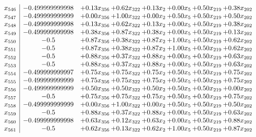 \documentclass[8pt]{article}
\begin{document}
\[\begin{array}{c| c c@{\hskip 2pt} c@{\hskip 2pt} c@{\hskip 2pt} c@{\hskip 2pt} c@{\hskip 2pt} c@{\hskip 2pt} }
 x_{546}   &  -0.499999999998 & +  0.13 x_{356} & +  0.62 x_{322} & +  0.13 x_{2} & +  0.00 x_{5} & +  0.50 x_{219} & +  0.38 x_{202}\\
 x_{547}   &  -0.499999999999 & +  0.00 x_{356} & +  1.00 x_{322} & +  0.00 x_{2} & +  0.50 x_{5} & +  0.50 x_{219} & +  0.50 x_{202}\\
 x_{548}   &  -0.499999999998 & +  0.13 x_{356} & +  0.62 x_{322} & +  0.13 x_{2} & +  0.00 x_{5} & +  0.50 x_{219} & +  0.38 x_{202}\\
 x_{549}   &  -0.499999999998 & +  0.38 x_{356} & +  0.87 x_{322} & +  0.38 x_{2} & +  0.00 x_{5} & +  0.50 x_{219} & +  0.13 x_{202}\\
 x_{550}   &  -0.5 & +  0.87 x_{356} & +  0.38 x_{322} & +  0.87 x_{2} & +  1.00 x_{5} & +  0.50 x_{219} & +  0.62 x_{202}\\
 x_{551}   &  -0.5 & +  0.87 x_{356} & +  0.38 x_{322} & +  0.87 x_{2} & +  1.00 x_{5} & +  0.50 x_{219} & +  0.62 x_{202}\\
 x_{552}   &  -0.5 & +  0.88 x_{356} & +  0.37 x_{322} & +  0.88 x_{2} & +  0.00 x_{5} & +  0.50 x_{219} & +  0.63 x_{202}\\
 x_{553}   &  -0.5 & +  0.88 x_{356} & +  0.37 x_{322} & +  0.88 x_{2} & +  0.00 x_{5} & +  0.50 x_{219} & +  0.63 x_{202}\\
 x_{554}   &  -0.499999999997 & +  0.75 x_{356} & +  0.75 x_{322} & +  0.75 x_{2} & +  0.50 x_{5} & +  0.50 x_{219} & +  0.75 x_{202}\\
 x_{555}   &  -0.499999999999 & +  0.75 x_{356} & +  0.75 x_{322} & +  0.75 x_{2} & +  0.50 x_{5} & +  0.50 x_{219} & +  0.75 x_{202}\\
 x_{556}   &  -0.499999999999 & +  0.50 x_{356} & +  0.50 x_{322} & +  0.50 x_{2} & +  0.50 x_{5} & +  0.50 x_{219} & +  0.00 x_{202}\\
 x_{557}   &  -0.5 & +  0.75 x_{356} & +  0.75 x_{322} & +  0.75 x_{2} & +  0.50 x_{5} & +  0.50 x_{219} & +  0.75 x_{202}\\
 x_{558}   &  -0.499999999999 & +  0.00 x_{356} & +  1.00 x_{322} & +  0.00 x_{2} & +  0.50 x_{5} & +  0.50 x_{219} & +  0.50 x_{202}\\
 x_{559}   &  -0.5 & +  0.88 x_{356} & +  0.37 x_{322} & +  0.88 x_{2} & +  0.00 x_{5} & +  0.50 x_{219} & +  0.63 x_{202}\\
 x_{560}   &  -0.499999999998 & +  0.63 x_{356} & +  0.12 x_{322} & +  0.63 x_{2} & +  0.00 x_{5} & +  0.50 x_{219} & +  0.88 x_{202}\\
 x_{561}   &  -0.5 & +  0.62 x_{356} & +  0.13 x_{322} & +  0.62 x_{2} & +  1.00 x_{5} & +  0.50 x_{219} & +  0.87 x_{202}\\

\end{array}\]
\end{document}
